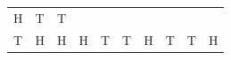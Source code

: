 {\begin{tabular}[t]{|l|l|l|l|l|l|l|l|l|l|}
        H &
        T &
        T%
     \tabularnewline\cline{1-1}\cline{2-2}\cline{3-3}\cline{4-4}\cline{5-5}\cline{6-6}\cline{7-7}\cline{8-8}\cline{9-9}\cline{10-10}
        T &
        H &
        H &
        H &
        T &
        T &
        H &
        T &
        T &
        H%

\end{tabular}}
